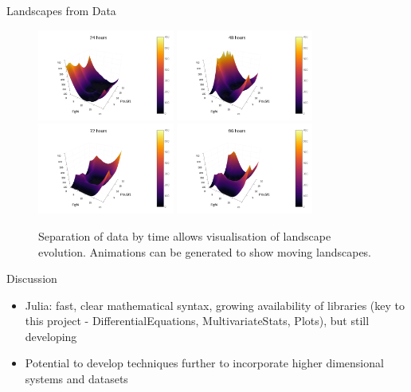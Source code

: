 \documentclass{beamer}
\begin{document}
\begin{frame}{Landscapes from Data}
\begin{figure}
\centering
\includegraphics[width=0.4\textwidth]{Fgf4_Pou5f1_day1.png}
\includegraphics[width=0.4\textwidth]{Fgf4_Pou5f1_day2.png} \\
\includegraphics[width=0.4\textwidth]{Fgf4_Pou5f1_day3.png}
\includegraphics[width=0.4\textwidth]{Fgf4_Pou5f1_day4.png}
\caption{Separation of data by time allows visualisation of landscape evolution. Animations can be generated to show moving landscapes.}
\end{figure}
\end{frame}

\begin{frame}{Discussion}
\begin{itemize}
\item Julia: fast, clear mathematical syntax, growing availability of libraries (key to this project - DifferentialEquations, MultivariateStats, Plots), but still developing
\item Potential to develop techniques further to incorporate higher dimensional systems and datasets
\end{itemize}
\end{frame}
\end{document}
